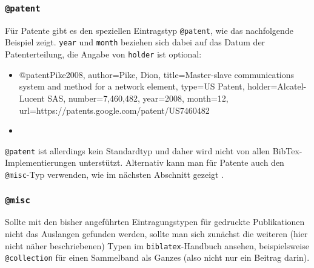 
\subsubsection{\texttt{@patent}}
\label{sec:@patent}

Für Patente gibt es den speziellen Eintragstyp \texttt{@patent},
wie das nachfolgende Beispiel zeigt. 
\texttt{year} und \texttt{month} beziehen sich dabei auf das Datum der
Patenterteilung, die Angabe von \texttt{holder} ist optional:
%
\begin{itemize}
\item[]
\begin{GenericCode}[numbers=none]
@patent{Pike2008,
	author={Pike, Dion},
  title={Master-slave communications system and method for a network element},
	type={US Patent},
	holder={Alcatel-Lucent SAS},
	number={7,460,482},
	year={2008},
	month={12},
	url={https://patents.google.com/patent/US7460482}
}
\end{GenericCode}
\item[\cite{Pike2008}] 
\end{itemize}
%
\texttt{@patent} ist allerdings kein Standardtyp und daher wird nicht
von allen BibTex-Imple\-mentier\-ungen unterstützt.
Alternativ kann man für Patente auch den \texttt{@misc}-Typ verwenden,
wie im nächsten Abschnitt gezeigt \cite{Hough62}.


\subsubsection{\texttt{@misc}}
\label{sec:@misc}

Sollte mit den bisher angeführten Eintragungstypen für gedruckte Publikationen
nicht das Auslangen gefunden werden, sollte man sich zunächst die weiteren (hier nicht näher beschriebenen) 
Typen im \texttt{biblatex}-Handbuch \cite{Lehman2016} ansehen, beispielsweise
\texttt{@collection} für einen Sammelband als Ganzes (also nicht nur ein Beitrag darin).

